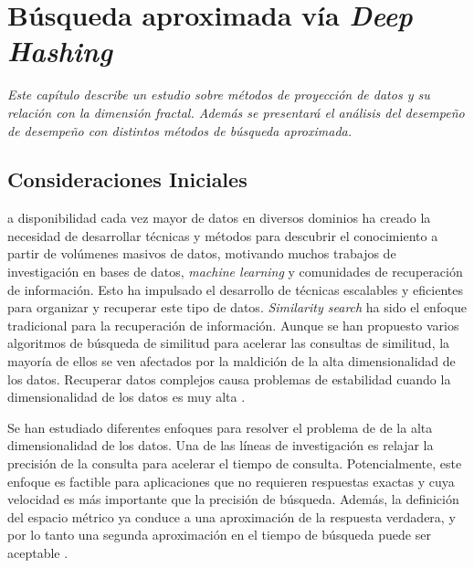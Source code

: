 
\chapter{Búsqueda aproximada vía \textit{Deep Hashing}}
{\textit{Este capítulo describe un estudio sobre métodos de proyección de datos y su relación con la dimensión fractal. Además se presentará el análisis del desempeño  de desempeño   con distintos  métodos de búsqueda aproximada. }}
 
\section{Consideraciones Iniciales}
 
a disponibilidad cada vez mayor de datos en diversos dominios ha creado la necesidad de desarrollar técnicas y métodos para descubrir el conocimiento a partir de volúmenes masivos de datos, motivando muchos trabajos de investigación en bases de datos, \textit{machine learning} y comunidades de recuperación de información. Esto ha impulsado el desarrollo de técnicas escalables y eficientes para organizar y recuperar este tipo de datos. \textit{Similarity search} ha sido el enfoque tradicional para la recuperación de información. Aunque se han propuesto varios algoritmos de búsqueda de similitud para acelerar las consultas de similitud, la mayoría de ellos se ven afectados por la maldición de la alta dimensionalidad de los datos. Recuperar datos complejos causa problemas de estabilidad cuando la dimensionalidad de los datos es muy alta \cite{aleman_high_dimensional}.


Se han estudiado diferentes enfoques para resolver el problema de de la alta dimensionalidad de los datos. Una de las líneas de investigación es relajar la precisión de la consulta para acelerar el tiempo de consulta. Potencialmente, este enfoque es factible para aplicaciones que no requieren respuestas exactas y cuya velocidad es más importante que la precisión de búsqueda. Además, la definición del espacio métrico ya conduce a una aproximación de la respuesta verdadera, y por lo tanto una segunda aproximación en el tiempo de búsqueda puede ser aceptable \cite{cit:avez99searching}.

